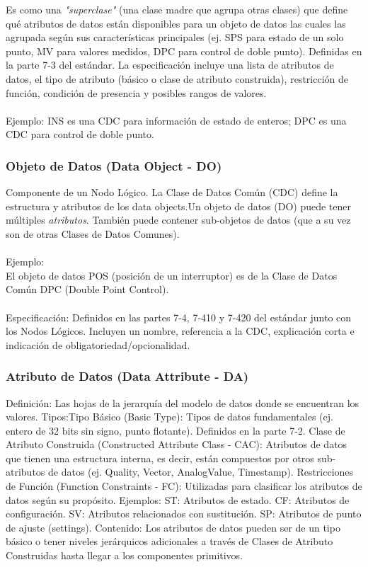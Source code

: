 \documentclass[a5paper]{book}%
\begin{document}
Es como una \textit{"superclase"} (una clase madre que agrupa otras clases) que define qué atributos de datos están disponibles para un objeto de datos las cuales las agrupada según sus características principales (ej. SPS para estado de un solo punto, MV para valores medidos, DPC para control de doble punto).  Definidas en la parte 7-3 del estándar. La especificación incluye una lista de atributos de datos, el tipo de atributo (básico o clase de atributo construida), restricción de función, condición de presencia y posibles rangos de valores.\\\\
Ejemplo: INS es una CDC para información de estado de enteros; DPC es una CDC para control de doble punto.

\subsubsection{Objeto de Datos (Data Object - DO)}

Componente de un Nodo Lógico. La Clase de Datos Común (CDC) define la estructura y atributos de los data objects.Un objeto de datos (DO) puede tener múltiples \textit{atributos}. También puede contener sub-objetos de datos (que a su vez son de otras Clases de Datos Comunes).\\\\
Ejemplo:\\
El objeto de datos POS (posición de un interruptor) es de la Clase de Datos Común DPC (Double Point Control).\\\\
    Especificación: Definidos en las partes 7-4, 7-410 y 7-420 del estándar junto con los Nodos Lógicos. Incluyen un nombre, referencia a la CDC, explicación corta e indicación de obligatoriedad/opcionalidad.



\subsubsection{Atributo de Datos (Data Attribute - DA)}

    Definición: Las hojas de la jerarquía del modelo de datos donde se encuentran los valores.
    Tipos:Tipo Básico (Basic Type): Tipos de datos fundamentales (ej. entero de 32 bits sin signo, punto flotante). Definidos en la parte 7-2.
    Clase de Atributo Construida (Constructed Attribute Class - CAC): Atributos de datos que tienen una estructura interna, es decir, están compuestos por otros sub-atributos de datos (ej. Quality, Vector, AnalogValue, Timestamp).
    Restricciones de Función (Function Constraints - FC): Utilizadas para clasificar los atributos de datos según su propósito. Ejemplos:
    ST: Atributos de estado.
    CF: Atributos de configuración.
    SV: Atributos relacionados con sustitución.
    SP: Atributos de punto de ajuste (settings).
    Contenido: Los atributos de datos pueden ser de un tipo básico o tener niveles jerárquicos adicionales a través de Clases de Atributo Construidas hasta llegar a los componentes primitivos.
\end{document}
